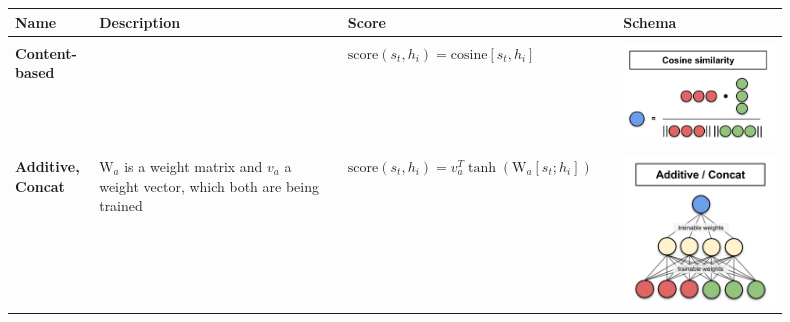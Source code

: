 \documentclass[11pt]{article}
\begin{document}
\begin{tabularx}{\linewidth}{m{0.1\linewidth} m{0.3\linewidth} m{0.3\linewidth} m{0.2\linewidth} }
	\textbf{Name} & \textbf{Description} & \textbf{Score} & \textbf{Schema}\\
	\hline
	& & & \\[-1em]
	\textbf{Content-based} & \parencite{graves2014neural} & $\text{score}(s_t,h_i) = \text{cosine}\left[s_t,h_i\right] $ & \includegraphics[width=\linewidth]{img/attention_cosine}\\
	& & & \\[-0.5em]
	\textbf{Additive, Concat} & $\text{W}_a$ is a weight matrix and $v_a $ a weight vector, which both are being trained \parencite{bahdanau2014neural} & $\text{score}(s_t,h_i) = v_a^T\tanh\left(\text{W}_a[s_t;h_i]\right) $ & \includegraphics[width=\linewidth]{img/attention_additive.png}\\

\end{tabularx}
\end{document}

